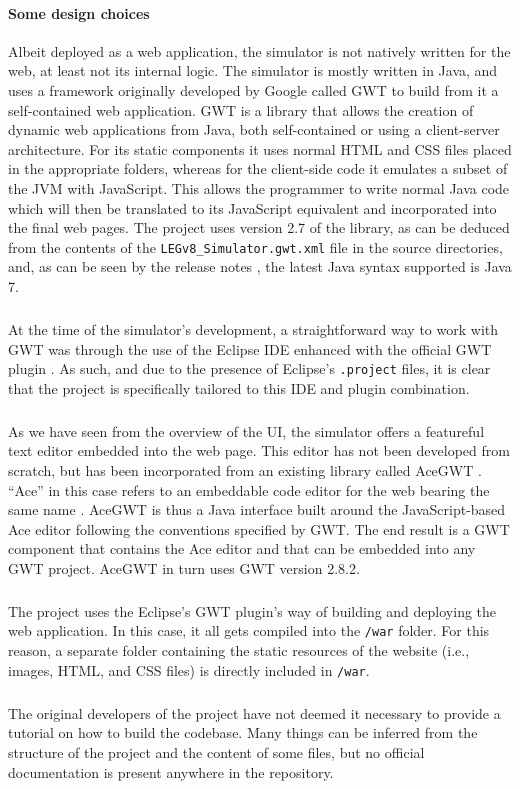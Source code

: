\paragraph{Some design choices}
Albeit deployed as a web application, the simulator is not natively written for the web, at least not its internal logic. The simulator is mostly written in Java, and uses a framework originally developed by Google called GWT \cite{gwtweb} to build from it a self-contained web application. GWT is a library that allows the creation of dynamic web applications from Java, both self-contained or using a client-server architecture. For its static components it uses normal HTML and CSS files placed in the appropriate folders, whereas for the client-side code it emulates a subset of the JVM \cite{wiki:jvm} with JavaScript. This allows the programmer to write normal Java code which will then be translated to its JavaScript equivalent and incorporated into the final web pages. The project uses version 2.7 of the library, as can be deduced from the contents of the  \verb|LEGv8_Simulator.gwt.xml| file in the source directories, and, as can be seen by the release notes \cite{gwt2.7web}, the latest Java syntax supported is Java 7.
\subparagraph{}
At the time of the simulator's development, a straightforward way to work with GWT was through the use of the Eclipse IDE \cite{web:eclipse} enhanced with the official GWT plugin \cite{web:eclipsegwtplugin}. As such, and due to the presence of Eclipse's \verb|.project| files, it is clear that the project is specifically tailored to this IDE and plugin combination.
\subparagraph{}
As we have seen from the overview of the UI, the simulator offers a featureful text editor embedded into the web page. This editor has not been developed from scratch, but has been incorporated from an existing library called AceGWT \cite{web:acegwtgit}. ``Ace'' in this case refers to an embeddable code editor for the web bearing the same name \cite{web:ace}. AceGWT is thus a Java interface built around the JavaScript-based Ace editor following the conventions specified by GWT. The end result is a GWT component that contains the Ace editor and that can be embedded into any GWT project. AceGWT in turn uses GWT version 2.8.2.
\subparagraph{}
The project uses the Eclipse's GWT plugin's way of building and deploying the web application. In this case, it all gets compiled into the \verb|/war| folder. For this reason, a separate folder containing the static resources of the website (i.e., images, HTML, and CSS files) is directly included in \verb|/war|.
\subparagraph{}
The original developers of the project have not deemed it necessary to provide a tutorial on how to build the codebase. Many things can be inferred from the structure of the project and the content of some files, but no official documentation is present anywhere in the repository.

